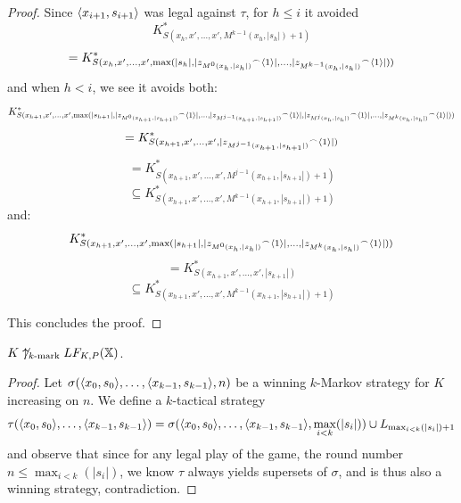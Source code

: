 \begin{proof}
Since $\langle x_{i+1},s_{i+1}\rangle$ was legal against $\tau$, for $h\leq i$ it avoided
  \[
    K^*_{S(x_h,x',\dots,x',M^{k-1}(x_h,|s_h|)+1)} 
  \]
  \[
    = 
    K^*_{S(x_h,x',\dots,x',\max(|s_h|,|{z_{M^{0}(x_h,|s_h|)}}^\frown\langle1\rangle|,\dots,|{z_{M^{k-1}(x_h,|s_h|)}}^\frown\langle1\rangle|))}
  \]
and when $h<i$, we see it avoids both:
  \[
    K^*_{S(x_{h+1},x',\dots,x',\max(|s_{h+1}|,|{z_{M^0(x_{h+1},|s_{h+1}|)}}^\frown\langle1\rangle|,\dots,|{z_{M^{j-1}(x_{h+1},|s_{h+1}|)}}^\frown\langle1\rangle|,|{z_{M^{j}(x_{h},|s_{h}|)}}^\frown\langle1\rangle|,\dots,|{z_{M^{k}(x_{h},|s_{h}|)}}^\frown\langle1\rangle|))} 
  \]
  \[
    =
    K^*_{S(x_{h+1},x',\dots,x',|{z_{M^{j-1}(x_{h+1},|s_{h+1}|)}}^\frown\langle1\rangle|)}
  \]
  \[
    =
    K^*_{S(x_{h+1},x',\dots,x',M^{j-1}(x_{h+1},|s_{h+1}|)+1)}
  \]
  \[
    \subseteq
    K^*_{S(x_{h+1},x',\dots,x',M^{k-1}(x_{h+1},|s_{h+1}|)+1)}
  \]
and:
  \[
    K^*_{S(x_{h+1},x',\dots,x',\max(|s_{h+1}|,|{z_{M^0(x_{h},|s_{h}|)}}^\frown\langle1\rangle|,\dots,|{z_{M^{k}(x_{h},|s_{h}|)}}^\frown\langle1\rangle|))} 
  \]
  \[
    =
    K^*_{S(x_{h+1},x',\dots,x',|s_{k+1}|)}
  \]
  \[
    \subseteq
    K^*_{S(x_{h+1},x',\dots,x',M^{k-1}(x_{h+1},|s_{h+1}|)+1)}
  \]


This concludes the proof.
\end{proof}

\begin{corollary}
$K\not\uparrow_{k\text{-mark}}LF_{K,P}(\mathbb{X})$.
\end{corollary}

\begin{proof}
Let $\sigma(\langle x_0,s_0\rangle,\dots,\langle x_{k-1},s_{k-1}\rangle,n)$ be a winning $k$-Markov strategy for $K$ increasing on $n$. We define a $k$-tactical strategy
  \[
    \tau(\langle x_0,s_0\rangle,\dots,\langle x_{k-1},s_{k-1}\rangle) = \sigma(\langle x_0,s_0\rangle,\dots,\langle x_{k-1},s_{k-1}\rangle,\max_{i<k}(|s_i|)) \cup L_{\max_{i<k}(|s_i|)+1}
  \]
and observe that since for any legal play of the game, the round number $n \leq \max_{i<k}(|s_i|)$, we know $\tau$ always yields supersets of $\sigma$, and is thus also a winning strategy, contradiction.
\end{proof}

\newpage

